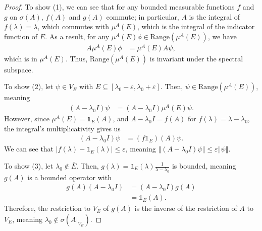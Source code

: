 \documentclass[10pt]{extarticle}
\newcommand{\norm}[1]{\left\Vert #1\right\Vert}
\theoremstyle{plain}
\theoremstyle{definition}
\theoremstyle{remark}
\renewcommand{\newline}{\hfill\break}
\begin{document}
  \begin{proof}
    To show (1), we can see that for any bounded measurable functions $f$ and $g$ on $\sigma(A)$, $f(A)$ and $g(A)$ commute; in particular, $A$ is the integral of $f(\lambda) = \lambda$, which commutes with $\mu^{A}(E)$, which is the integral of the indicator function of $E$. As a result, for any $\mu^{A}(E)\phi \in \text{Range}\left(\mu^{A}(E)\right)$, we have
    \begin{align*}
      A\mu^{A}(E)\phi &= \mu^{A}(E)A\psi,
    \end{align*}
    which is in $\mu^{A}(E)$. Thus, $\text{Range}\left(\mu^{A}(E)\right)$ is invariant under the spectral subspace.\newline

    To show (2), let $\psi \in V_E$ with $E \subseteq [\lambda_0 - \varepsilon,\lambda_0 + \varepsilon]$. Then, $\psi\in \text{Range}\left(\mu^{A}(E)\right)$, meaning
    \begin{align*}
      (A - \lambda_0 I)\psi &= (A - \lambda_0 I)\mu^{A}(E)\psi.
    \end{align*}
    However, since $\mu^{A}(E) = \mathbb{1}_{E}(A)$, and $A - \lambda_0 I = f(A)$ for $f(\lambda) = \lambda - \lambda_0$, the integral's multiplicativity gives us
    \begin{align*}
      (A - \lambda_0 I)\psi &= \left(f\mathbb{1}_{E}\right)(A)\psi.
    \end{align*}
    We can see that $\left\vert f(\lambda) - \mathbb{1}_{E}(\lambda) \right\vert \leq \varepsilon$, meaning $\norm{(A - \lambda_0 I)\psi} \leq \varepsilon \norm{\psi}$.\newline

    To show (3), let $\lambda_0 \notin \overline{E}$. Then, $g(\lambda) = \mathbb{1}_{E}(\lambda)\frac{1}{\lambda - \lambda_0}$ is bounded, meaning $g(A)$ is a bounded operator with
    \begin{align*}
      g(A)\left(A - \lambda_0 I\right) &= (A - \lambda_0 I)g(A)\\
                                       &= \mathbb{1}_{E}(A).
    \end{align*}
    Therefore, the restriction to $V_E$ of $g(A)$ is the inverse of the restriction of $A$ to $V_E$, meaning $\lambda_0\notin \sigma\left(A\rvert_{V_E}\right)$.\newline


\end{proof}
\end{document}
